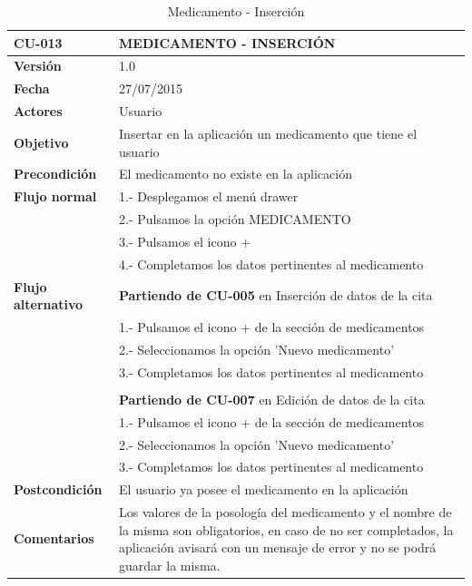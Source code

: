 \documentclass[../pfc.tex]{subfiles}
\begin{document}
		\begin{table}[H]
			\centering
			\begin{tabular}[t]{|p{3cm}|p{9.5cm}|}
				\hline \textbf{CU-013} & \textbf{MEDICAMENTO - INSERCIÓN} \\*
				\hline\hline \textbf{Versión} & 1.0 \\*
				\hline\hline \textbf{Fecha} & 27/07/2015 \\*
				\hline\textbf{Actores} 	& Usuario\\*
				\hline \textbf{Objetivo} & Insertar en la aplicación un medicamento que tiene el usuario\\* 			
				\hline \textbf{Precondición} & El medicamento no existe en la aplicación\\* 
				\hline \textbf{Flujo normal} & 1.- Desplegamos el menú drawer \\* 
				& 2.- Pulsamos la opción MEDICAMENTO\\*	
				& 3.- Pulsamos el icono + \\*	
				& 4.- Completamos los datos pertinentes al medicamento\\*	
				\hline \textbf{Flujo alternativo} & \textbf{Partiendo de CU-005} en Inserción de datos de la cita\\* 
				& 1.- Pulsamos el icono + de la sección de medicamentos\\*	
				& 2.- Seleccionamos la opción 'Nuevo medicamento'\\*
				& 3.- Completamos los datos pertinentes al medicamento\\*
				& \\*
				& \textbf{Partiendo de CU-007} en Edición de datos de la cita\\* 
				& 1.- Pulsamos el icono + de la sección de medicamentos\\*	
				& 2.- Seleccionamos la opción 'Nuevo medicamento'\\*
				& 3.- Completamos los datos pertinentes al medicamento\\*
				\hline \textbf{Postcondición} & El usuario ya posee el medicamento en la aplicación \\* 
				\hline \textbf{Comentarios}   & Los valores de la posología del medicamento y el nombre de la misma son obligatorios, en caso de no ser completados, la aplicación avisará con un mensaje de error y no se podrá guardar la misma.\\*
				\hline
			\end{tabular}
			\caption{Medicamento - Inserción}
			\label{tabla:caso013}
		\end{table}
		
\end{document}
